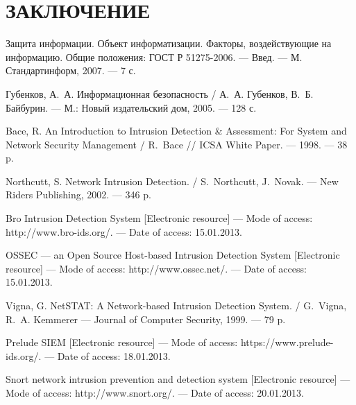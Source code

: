 \section*{ЗАКЛЮЧЕНИЕ}

\newpage

\renewcommand{\refname}{СПИСОК ИСПОЛЬЗОВАННЫХ ИСТОЧНИКОВ}

\begin{thebibliography}{99}
    
    Защита информации. Объект информатизации. Факторы, воздействующие
    на информацию. Общие положения: ГОСТ Р 51275-2006. --- Введ. --- М.~
    Стандартинформ, 2007. --- 7 с.
    
    Губенков, А.~А. Информационная безопасность / А.~А. Губенков, В.~Б. Байбурин. ---
    М.: Новый издательский дом, 2005. --- 128 с.
    
    Bace, R. An Introduction to Intrusion Detection \& Assessment: For System and Network 
    Security Management / R.~Bace // ICSA White Paper. --- 1998. --- 38 p.
    
    \bibitem{}
	Northcutt, S. Network Intrusion Detection. / S.~Northcutt, J.~Novak. --- 
	New Riders Publishing, 2002. --- 346 p.
	
	Bro Intrusion Detection System [Electronic resource] --- Mode of access: 
	http://www.bro-ids.org/. --- Date of access: 15.01.2013.
	
	OSSEC --- an Open Source Host-based Intrusion Detection System [Electronic resource] 
	--- Mode of access: http://www.ossec.net/. --- Date of access: 15.01.2013.
	
	Vigna, G. NetSTAT: A Network-based Intrusion Detection System. / G.~Vigna, 
	R.~A. Kemmerer --- Journal of Computer Security, 1999. --- 79 p.
	
	Prelude SIEM [Electronic resource]	--- Mode of access: 
	https://www.prelude-ids.org/. --- Date of access: 18.01.2013.
	
	Snort network intrusion prevention and detection system [Electronic resource] ---
	Mode of access: http://www.snort.org/. --- Date of access: 20.01.2013.
	 
\end{thebibliography}